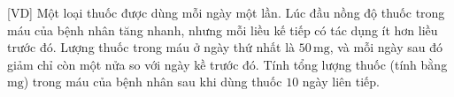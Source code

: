 \begin{bt}%
[VD]%
	Một loại thuốc được dùng mỗi ngày một lần. Lúc đầu nồng độ thuốc trong máu của bệnh nhân tăng nhanh, nhưng mỗi liều kế tiếp có tác dụng ít hơn liều trước đó. Lượng thuốc trong máu ở ngày thứ nhất là $50 \,\mathrm{mg}$, và mỗi ngày sau đó giảm chỉ còn một nửa so với ngày kề trước đó. Tính tổng lượng thuốc (tính bằng $\mathrm{mg}$) trong máu của bệnh nhân sau khi dùng thuốc $10$ ngày liên tiếp.
\end{bt}

